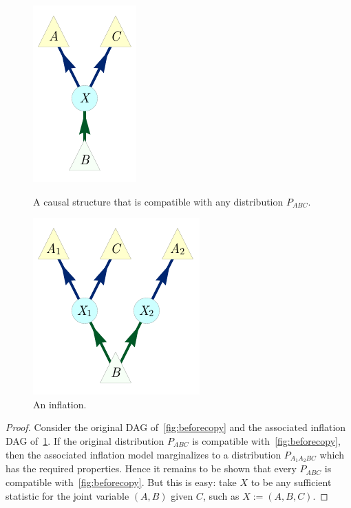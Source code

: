\begin{figure}[t]
\centering
\hspace{40pt}
\begin{minipage}[t]{0.23\linewidth}
\centering
\includegraphics[scale=1]{shannonnocopy.pdf}
\caption{A causal structure that is compatible with any distribution $P_{ABC}$.}\label{fig:beforecopy}
\end{minipage}
\hfill
\begin{minipage}[t]{0.38\linewidth}
\centering
\includegraphics[scale=1]{shannonyescopy}
\caption{An inflation.}\label{fig:aftercopy}
\end{minipage}
\hspace{40pt}
\end{figure}

\begin{proof}
	Consider the original DAG of~\cref{fig:beforecopy} and the associated inflation DAG of~\cref{fig:aftercopy}. If the original distribution $P_{ABC}$ is compatible with~\cref{fig:beforecopy}, then the associated inflation model marginalizes to a distribution $P_{A_1 A_2 B C}$ which has the required properties. Hence it remains to be shown that every $P_{ABC}$ is compatible with~\cref{fig:beforecopy}.  But this is easy: take $X$ to be any sufficient statistic for the joint variable $(A,B)$ given $C$, such as $X := (A,B,C)$.
\end{proof}

